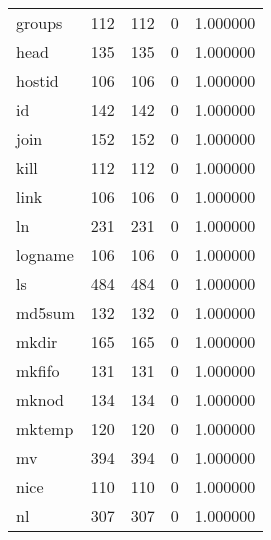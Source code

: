\begin{longtable}{lrrrr}
groups    &                     112 &              112 &                 0 &                     1.000000 \\
head      &                     135 &              135 &                 0 &                     1.000000 \\
hostid    &                     106 &              106 &                 0 &                     1.000000 \\
id        &                     142 &              142 &                 0 &                     1.000000 \\
join      &                     152 &              152 &                 0 &                     1.000000 \\
kill      &                     112 &              112 &                 0 &                     1.000000 \\
link      &                     106 &              106 &                 0 &                     1.000000 \\
ln        &                     231 &              231 &                 0 &                     1.000000 \\
logname   &                     106 &              106 &                 0 &                     1.000000 \\
ls        &                     484 &              484 &                 0 &                     1.000000 \\
md5sum    &                     132 &              132 &                 0 &                     1.000000 \\
mkdir     &                     165 &              165 &                 0 &                     1.000000 \\
mkfifo    &                     131 &              131 &                 0 &                     1.000000 \\
mknod     &                     134 &              134 &                 0 &                     1.000000 \\
mktemp    &                     120 &              120 &                 0 &                     1.000000 \\
mv        &                     394 &              394 &                 0 &                     1.000000 \\
nice      &                     110 &              110 &                 0 &                     1.000000 \\
nl        &                     307 &              307 &                 0 &                     1.000000 \\

\end{longtable}
